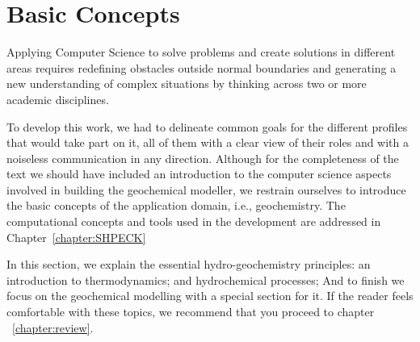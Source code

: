 \chapter{Basic Concepts}
\label{chapter:basic}

Applying Computer Science to solve problems and create solutions in different areas requires redefining obstacles outside normal boundaries and generating a new understanding of complex situations by thinking across two or more academic disciplines. 

To develop this work, we had to delineate common goals for the different profiles that would take part on it, all of them with a clear view of their roles and with a noiseless communication in any direction. Although for the completeness of the text we should have included an introduction to the computer science aspects involved in building the geochemical modeller, we restrain ourselves to introduce the basic concepts of the application domain, i.e., geochemistry. The computational concepts and tools used in the development are addressed in Chapter~\ref{chapter:SHPECK}

In this section, we explain the essential hydro-geochemistry principles: an introduction to thermodynamics; and hydrochemical processes; And to finish we focus on the geochemical modelling with a special section for it. If the reader feels comfortable with these topics, we recommend that you proceed to chapter ~\ref{chapter:review}.



